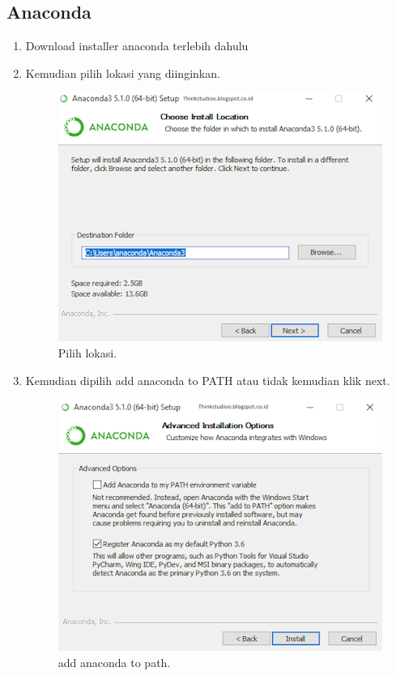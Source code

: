 \documentclass[lipt]{Article}
\begin{document}
\subsection{Anaconda}
\begin{enumerate}
\item Download installer anaconda terlebih dahulu 

\item Kemudian pilih lokasi yang diinginkan.
\begin{figure}[htbp]
\centerline{\includegraphics{1.png}}
\caption{Pilih lokasi.}
\label{fig}
\end{figure}

\item Kemudian dipilih add anaconda to PATH atau tidak kemudian klik next.
\begin{figure}[htbp]
\centerline{\includegraphics{chapters/gambar/2.png}}
\caption{add anaconda to path.}
\label{fig}
\end{figure}


\end{enumerate}
\end{document}
